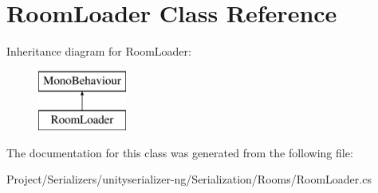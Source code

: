 \hypertarget{class_room_loader}{}\section{Room\+Loader Class Reference}
\label{class_room_loader}
Inheritance diagram for Room\+Loader\+:\begin{figure}[H]
\begin{center}
\leavevmode
\includegraphics[height=2.000000cm]{class_room_loader}
\end{center}
\end{figure}


The documentation for this class was generated from the following file\+:\begin{DoxyCompactItemize}
\item 
Project/\+Serializers/unityserializer-\/ng/\+Serialization/\+Rooms/Room\+Loader.\+cs\end{DoxyCompactItemize}
